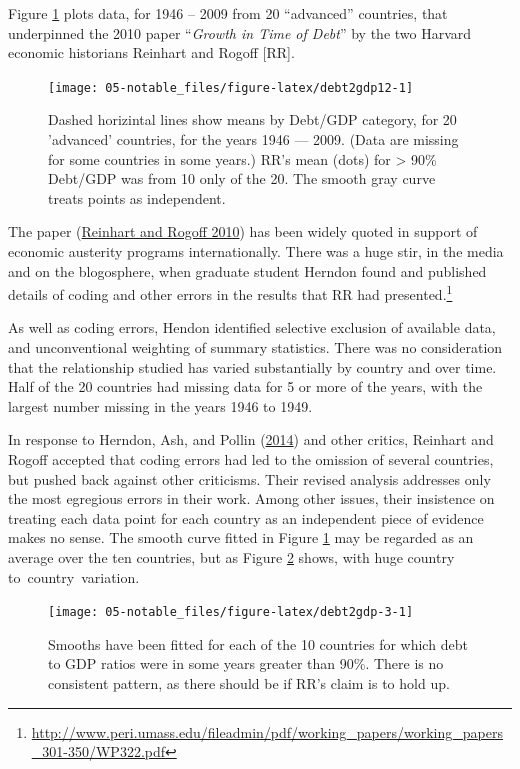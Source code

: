 \documentclass[
  10pt,
  b5paper]{book}
\begin{document}
Figure \ref{fig:debt2gdp12} plots data, for 1946 -- 2009
from 20 ``advanced'' countries, that underpinned the 2010
paper ``\emph{Growth in Time of Debt}'' by the two Harvard economic
historians Reinhart and Rogoff {[}RR{]}.

\begin{figure}[H]

{\centering \texttt{[image: 05-notable\_files/figure-latex/debt2gdp12-1]} 

}

\caption{Dashed horizintal lines show means by Debt/GDP category, 
for 20 'advanced' countries, for the years 1946 --- 2009.
(Data are missing for some countries in some years.)
RR's mean (dots) for > 90\% Debt/GDP was from 10 only of the 20. 
The smooth gray curve treats points as independent.}\label{fig:debt2gdp12}
\end{figure}

The paper (\protect\hyperlink{ref-reinhart2010growth}{Reinhart and Rogoff 2010})
has been widely quoted in support of economic austerity programs
internationally. There was a huge stir, in the media and on the
blogosphere, when graduate student Herndon found and published
details of coding and other errors in the results that RR had
presented.\footnote{\url{http://www.peri.umass.edu/fileadmin/pdf/working_papers/working_papers_301-350/WP322.pdf}}

As well as coding errors, Hendon identified selective exclusion of
available data, and unconventional weighting of summary statistics.
There was no consideration that the relationship studied has varied
substantially by country and over time. Half of the 20 countries
had missing data for 5 or more of the years, with the largest
number missing in the years 1946 to 1949.

In response to Herndon, Ash, and Pollin (\protect\hyperlink{ref-herndon2014does}{2014}) and other critics, Reinhart and
Rogoff accepted that coding errors had led to the omission of
several countries, but pushed back against other criticisms.
Their revised analysis addresses only the most egregious errors
in their work. Among other issues, their insistence on treating
each data point for each country as an independent piece of
evidence makes no sense. The smooth curve fitted in Figure
\ref{fig:debt2gdp12} may be regarded as an average over the
ten countries, but as Figure \ref{fig:debt2gdp-3} shows, with
huge country to~country~variation.

\begin{figure}[H]

{\centering \texttt{[image: 05-notable\_files/figure-latex/debt2gdp-3-1]} 

}

\caption{Smooths have been fitted for each of the 10 countries
for which debt to GDP ratios were in some years greater than 90\%.
There is no consistent pattern, as there should be if RR's claim
is to hold up.}\label{fig:debt2gdp-3}
\end{figure}
\end{document}
